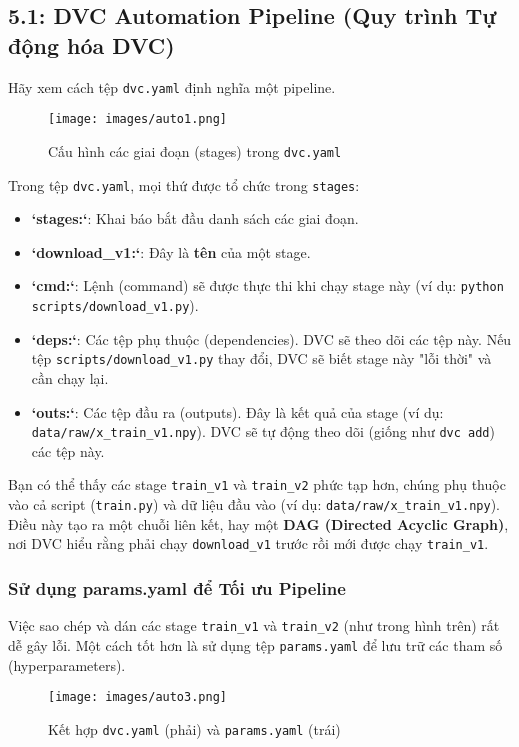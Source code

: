 \documentclass[11pt]{article}
\begin{document}
\subsection{5.1: DVC Automation Pipeline (Quy trình Tự động hóa DVC)}
Hãy xem cách tệp \texttt{dvc.yaml} định nghĩa một pipeline.

\begin{figure}[H]
    \centering
    \texttt{[image: images/auto1.png]}
    \caption{Cấu hình các giai đoạn (stages) trong \texttt{dvc.yaml}}
\end{figure}

Trong tệp \texttt{dvc.yaml}, mọi thứ được tổ chức trong \texttt{stages}:
\begin{itemize}
    \item \textbf{`stages:`}: Khai báo bắt đầu danh sách các giai đoạn.
    \item \textbf{`download_v1:`}: Đây là \textbf{tên} của một stage.
    \item \textbf{`cmd:`}: Lệnh (command) sẽ được thực thi khi chạy stage này (ví dụ: \texttt{python scripts/download\_v1.py}).
    \item \textbf{`deps:`}: Các tệp phụ thuộc (dependencies). DVC sẽ theo dõi các tệp này. Nếu tệp \texttt{scripts/download\_v1.py} thay đổi, DVC sẽ biết stage này "lỗi thời" và cần chạy lại.
    \item \textbf{`outs:`}: Các tệp đầu ra (outputs). Đây là kết quả của stage (ví dụ: \texttt{data/raw/x\_train\_v1.npy}). DVC sẽ tự động theo dõi (giống như \texttt{dvc add}) các tệp này.
\end{itemize}
Bạn có thể thấy các stage \texttt{train_v1} và \texttt{train_v2} phức tạp hơn, chúng phụ thuộc vào cả script (\texttt{train.py}) và dữ liệu đầu vào (ví dụ: \texttt{data/raw/x\_train\_v1.npy}). Điều này tạo ra một chuỗi liên kết, hay một \textbf{DAG (Directed Acyclic Graph)}, nơi DVC hiểu rằng phải chạy \texttt{download_v1} trước rồi mới được chạy \texttt{train_v1}.

\subsubsection{Sử dụng params.yaml để Tối ưu Pipeline}
Việc sao chép và dán các stage \texttt{train_v1} và \texttt{train_v2} (như trong hình trên) rất dễ gây lỗi. Một cách tốt hơn là sử dụng tệp \texttt{params.yaml} để lưu trữ các tham số (hyperparameters).

\begin{figure}[H]
    \centering
    \texttt{[image: images/auto3.png]}
    \caption{Kết hợp \texttt{dvc.yaml} (phải) và \texttt{params.yaml} (trái)}
\end{figure}
\end{document}
